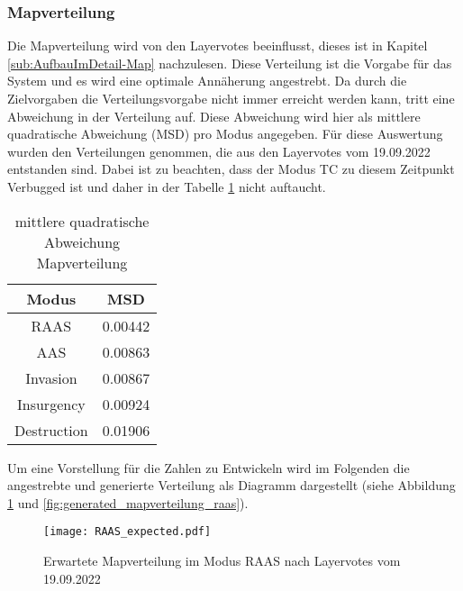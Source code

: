         \subsubsection{Mapverteilung}
            Die Mapverteilung wird von den Layervotes beeinflusst, dieses ist in Kapitel \ref{sub:AufbauImDetail-Map} nachzulesen.
            Diese Verteilung ist die Vorgabe für das System und es wird eine optimale Annäherung angestrebt. Da durch die
            Zielvorgaben die Verteilungsvorgabe nicht immer erreicht werden kann, tritt eine Abweichung in der Verteilung auf.
            Diese Abweichung wird hier als mittlere quadratische Abweichung (MSD) pro Modus angegeben.
            Für diese Auswertung wurden den Verteilungen genommen, die aus den Layervotes vom 19.09.2022 entstanden sind.
            Dabei ist zu beachten, dass der Modus TC zu diesem Zeitpunkt \glqq{}Verbugged\grqq{} ist und daher
            in der Tabelle \ref{t:Ergebnisse:fehler_Mapverteilung} nicht auftaucht.\\
            \begin{table}[h]
                \centering
                \begin{tabular}{|| c c ||}
                    \hline
                    Modus & MSD \\
                    \hline
                    \hline
                    RAAS & 0.00442 \\ %
                    \hline
                    AAS & 0.00863 \\ %
                    \hline
                    Invasion & 0.00867 \\ %
                    \hline
                    Insurgency & 0.00924 \\ %
                    \hline
                    Destruction & 0.01906 \\ %
                    \hline
                \end{tabular}
                \caption{mittlere quadratische Abweichung Mapverteilung}
                \label{t:Ergebnisse:fehler_Mapverteilung}
            \end{table}

            Um eine Vorstellung für die Zahlen zu Entwickeln wird im Folgenden die angestrebte und generierte Verteilung als
            Diagramm dargestellt (siehe Abbildung \ref{fig:expected_mapverteilung_raas}
            und \ref{fig:generated_mapverteilung_raas}).

            \begin{figure}[htbp]
                \centering
                \texttt{[image: RAAS\_expected.pdf]}
                \caption{Erwartete Mapverteilung im Modus RAAS nach Layervotes vom 19.09.2022}
                \label{fig:expected_mapverteilung_raas}
            \end{figure}

